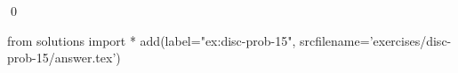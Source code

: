 
\begin{ex} 
  \label{ex:disc-prob-15}
  
  \qed
\end{ex} 
\begin{python0}
from solutions import *
add(label="ex:disc-prob-15",
    srcfilename='exercises/disc-prob-15/answer.tex') 
\end{python0}
